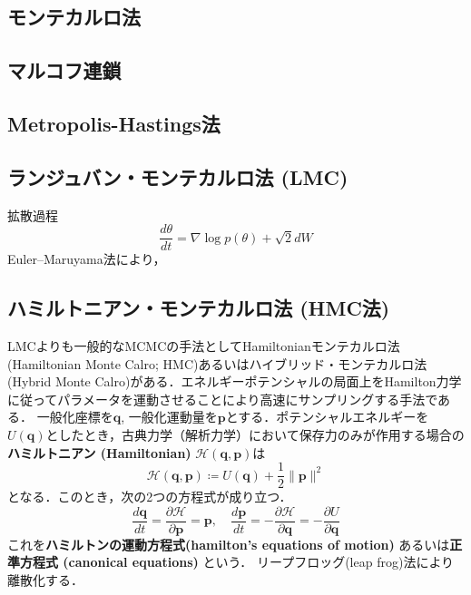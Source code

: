 \subsection{モンテカルロ法}
\subsection{マルコフ連鎖}
\subsection{Metropolis-Hastings法}
\subsection{ランジュバン・モンテカルロ法 (LMC)}
拡散過程
\begin{equation}
{\frac{d\theta}{dt}}=\nabla \log p (\theta)+{\sqrt 2}{d{W}}
\end{equation}
Euler–Maruyama法により，
\subsection{ハミルトニアン・モンテカルロ法 (HMC法)}
LMCよりも一般的なMCMCの手法としてHamiltonianモンテカルロ法(Hamiltonian Monte Calro; HMC)あるいはハイブリッド・モンテカルロ法(Hybrid Monte Calro)がある．エネルギーポテンシャルの局面上をHamilton力学に従ってパラメータを運動させることにより高速にサンプリングする手法である．
一般化座標を$\mathbf{q}$, 一般化運動量を$\mathbf{p}$とする．ポテンシャルエネルギーを$U(\mathbf{q})$としたとき，古典力学（解析力学）において保存力のみが作用する場合の\textbf{ハミルトニアン (Hamiltonian)} $\mathcal{H}(\mathbf{q}, \mathbf{p})$は
\begin{equation}
\mathcal{H}(\mathbf{q}, \mathbf{p})\coloneqq U(\mathbf{q})+\frac{1}{2}\|\mathbf{p}\|^2
\end{equation}
となる．このとき，次の2つの方程式が成り立つ．
\begin{equation}
\frac{d\mathbf{q}}{dt}=\frac{\partial \mathcal{H}}{\partial \mathbf{p}}=\mathbf{p},\quad\frac{d\mathbf{p}}{dt}=-\frac{\partial \mathcal{H}}{\partial \mathbf{q}}=-\frac{\partial U}{\partial \mathbf{q}}
\end{equation}
これを\textbf{ハミルトンの運動方程式(hamilton's equations of motion)} あるいは\textbf{正準方程式 (canonical equations)} という．
リープフロッグ(leap frog)法により離散化する．
